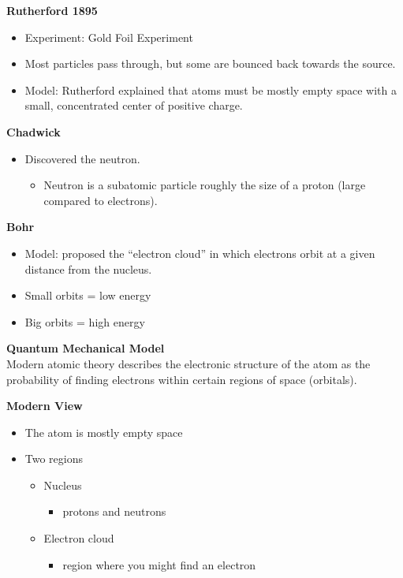 \documentclass[../hchem.tex]{subfiles}
\begin{document}
\textbf{Rutherford 1895}
\begin{itemize}
    \item Experiment: Gold Foil Experiment 
    \item Most particles pass through, but some are bounced back towards the source.
    \item Model: Rutherford explained that atoms must be mostly empty space with a small, concentrated center of positive charge.
\end{itemize}

\textbf{Chadwick}
\begin{itemize}
    \item Discovered the neutron.
    \begin{itemize}
        \item Neutron is a subatomic particle roughly the size of a proton (large compared to electrons).
    \end{itemize}
\end{itemize}

\textbf{Bohr}
\begin{itemize}
    \item Model: proposed the ``electron cloud'' in which electrons orbit at a given distance from the nucleus.
    \item Small orbits = low energy 
    \item Big orbits = high energy 
\end{itemize}

\textbf{Quantum Mechanical Model}\\
Modern atomic theory describes the electronic structure of the atom as the probability of finding electrons within certain regions of space (orbitals).

\textbf{Modern View}
\begin{itemize}
    \item The atom is mostly empty space
    \item Two regions 
    \begin{itemize}
        \item Nucleus 
        \begin{itemize}
            \item protons and neutrons 
        \end{itemize}
        \item Electron cloud 
        \begin{itemize}
            \item region where you might find an electron 
        \end{itemize}
    \end{itemize}
\end{itemize}
\end{document}
